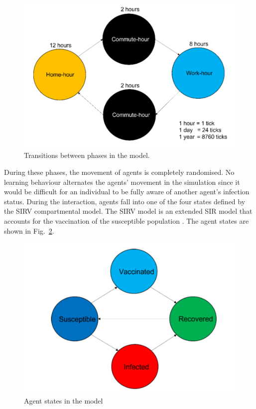 \documentclass[smallextended]{svjour3}       %
\begin{document}
\begin{figure}
	\centering
	\includegraphics[width=\linewidth]{figures/ModelTransitions.png}
	\caption{Transitions between phases in the model.\label{fig:modeltrans}}
\end{figure}

During these phases, the movement of agents is completely randomised. No learning behaviour alternates the agents' movement in the simulation since it would be difficult for an individual to be fully aware of another agent's infection status. During the interaction, agents fall into one of the four states defined by the SIRV compartmental model. The SIRV model is an extended SIR model that accounts for the vaccination of the susceptible population \cite{poonia2022enhanced}. The agent states are shown in Fig.~\ref{fig:agentstates}.

\begin{figure}
	\centering
	\includegraphics[width=\linewidth]{figures/AgentStates.png}	
	\caption{Agent states in the model\label{fig:agentstates}}
\end{figure}
\end{document}
